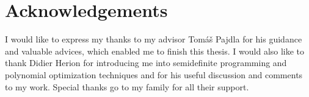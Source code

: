\mbox{}\vfill

{\let\clearpage\relax\par \chapter*{Acknowledgements}}
I would like to express my thanks to my advisor Tom\'a\v s Pajdla for his guidance and valuable advices, which enabled me to finish this thesis.
I would also like to thank Didier Herion for introducing me into semidefinite programming and polynomial optimization techniques and for his useful discussion and comments to my work.
Special thanks go to my family for all their support.
